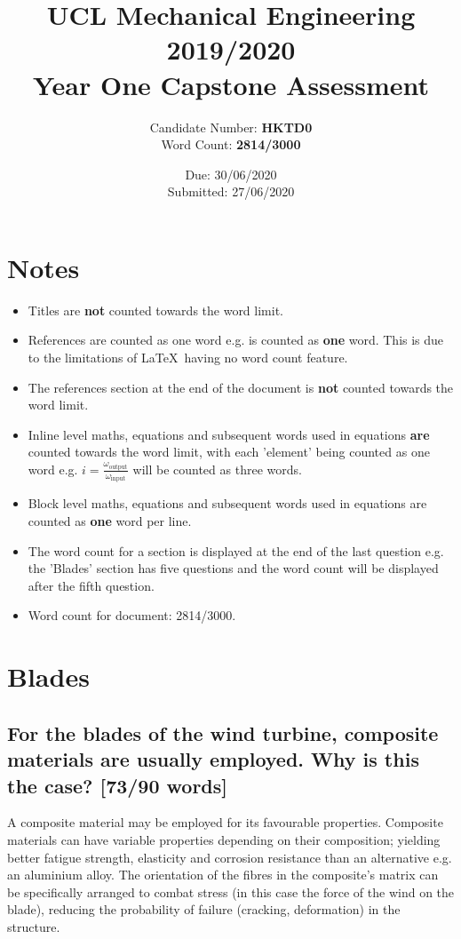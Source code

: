 \documentclass[12pt]{article}
\newcommand{\citeprimsec}[2]{\citep[][cited by \citealp{#2}]{#1}}
\numberwithin{equation}{section}
\begin{document}
\title{\textbf{UCL Mechanical Engineering 2019/2020}\\Year One Capstone Assessment}
\date{Due: 30/06/2020\\Submitted: 27/06/2020}
\author{Candidate Number: \textbf{HKTD0}\\Word Count: \textbf{2814/3000}}
\maketitle
\begin{flushleft}
\tableofcontents
\newpage

\section*{Notes}
\begin{itemize}
  \item Titles are \textbf{not} counted towards the word limit.
  \item References are counted as one word e.g. \citeprimsec{windTurbineMaterial2}{windTurbineMaterial} is counted as \textbf{one} word. This is due to the limitations of \LaTeX \ having no word count feature.
  \item The references section at the end of the document is \textbf{not} counted towards the word limit.
  \item Inline level maths, equations and subsequent words used in equations \textbf{are} counted towards the word limit, with each 'element' being counted as one word e.g. $i = \frac{\omega_{\textrm{output}}}{\omega_{\textrm{input}}}$ will be counted as three words.
  \item Block level maths, equations and subsequent words used in equations are counted as \textbf{one} word per line.
  \item The word count for a section is displayed at the end of the last question e.g. the 'Blades' section has five questions and the word count will be displayed after the fifth question.
  \item Word count for document: 2814/3000.
\end{itemize}
\newpage

\section{Blades}
\subsection[Why use composites?]{For the blades of the wind turbine, composite materials are usually employed. Why is this the case? [73/90 words]}
A composite material may be employed for its favourable properties. Composite materials can have variable properties depending on their composition; yielding better fatigue strength, elasticity and corrosion resistance than an alternative e.g. an aluminium alloy. The orientation of the fibres in the composite's matrix can be specifically arranged to combat stress (in this case the force of the wind on the blade), reducing the probability of failure (cracking, deformation) in the structure.


\end{flushleft}
\end{document}

